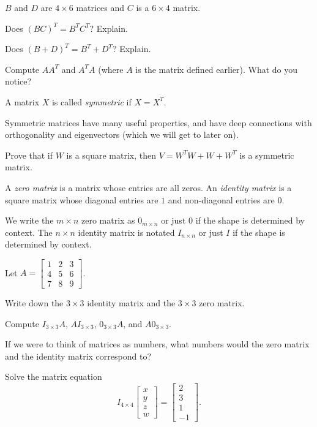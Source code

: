 \documentclass[14pt]{problemset}
\newcommand{\mat}[1]{\begin{bmatrix}#1\end{bmatrix}}
\begin{document}
	$B$ and $D$ are $4\times 6$ matrices and $C$ is a $6\times 4$ matrix.

	\begin{parts}[resume]
		\item Does $(BC)^T=B^TC^T$? Explain.
		\item Does $(B+D)^T=B^T+D^T$? Explain.
		\item Compute $AA^T$ and $A^TA$ (where $A$ is the matrix defined earlier).
		What do you notice?
	\end{parts}

	\question
	\begin{definition}
		A matrix $X$ is called \emph{symmetric} if $X=X^T$.  
	\end{definition}
	Symmetric matrices have many useful properties,
	and have deep connections with orthogonality and eigenvectors (which we will get to later on).

	\begin{parts}
		\item Prove that if $W$ is a square matrix, then $V=W^TW+W+W^T$ is a symmetric
		matrix.
	\end{parts}

	\question
	\begin{definition}
		A \emph{zero matrix} is a matrix whose entries are all zeros.
		An \emph{identity matrix} is a square matrix whose diagonal
		entries are $1$ and non-diagonal entries are $0$.
	\end{definition}
	We write the $m\times n$ zero matrix as $0_{m\times n}$ or just $0$ if the shape
	is determined by context.  The $n\times n$ identity matrix is notated $I_{n\times n}$ or just
	$I$ if the shape is determined by context.

	Let $A=\mat{1&2&3\\4&5&6\\7&8&9}$.
	\begin{parts}
		\item Write down the $3\times 3$ identity matrix and the $3\times 3$ zero
		matrix.
		\item Compute $I_{3\times 3}A$, $AI_{3\times 3}$, $0_{3\times 3}A$,
		and $A0_{3\times 3}$.
		\item If we were to think of matrices as numbers, what numbers would the
		zero matrix and the identity matrix correspond to?
	\end{parts}

	\question
	\begin{parts}
		\item Solve the matrix equation
		\[
			I_{4\times 4}\mat{x\\y\\z\\w} = \mat{2\\3\\1\\-1}.
		\]
	\end{parts}
\end{document}
